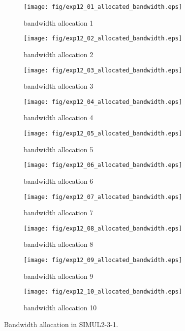 	\begin{figure}
		\begin{center}
			\begin{subfigure}[b]{0.32\textwidth}
				\texttt{[image: fig/exp12\_01\_allocated\_bandwidth.eps]}
				\caption{bandwidth allocation 1}
				\label{figure:simul2_3_1_b_a}
			\end{subfigure}
			\begin{subfigure}[b]{0.32\textwidth}
				\texttt{[image: fig/exp12\_02\_allocated\_bandwidth.eps]}
				\caption{bandwidth allocation 2}
				\label{figure:simul2_3_1_b_b}
			\end{subfigure}
			\begin{subfigure}[b]{0.32\textwidth}
				\texttt{[image: fig/exp12\_03\_allocated\_bandwidth.eps]}
				\caption{bandwidth allocation 3}
				\label{figure:simul2_3_1_b_c}
			\end{subfigure}
			\begin{subfigure}[b]{0.32\textwidth}
				\texttt{[image: fig/exp12\_04\_allocated\_bandwidth.eps]}
				\caption{bandwidth allocation 4}
				\label{figure:simul2_3_1_b_d}
			\end{subfigure}
			\begin{subfigure}[b]{0.32\textwidth}
				\texttt{[image: fig/exp12\_05\_allocated\_bandwidth.eps]}
				\caption{bandwidth allocation 5}
				\label{figure:simul2_3_1_b_e}
			\end{subfigure}
			\begin{subfigure}[b]{0.32\textwidth}
				\texttt{[image: fig/exp12\_06\_allocated\_bandwidth.eps]}
				\caption{bandwidth allocation 6}
				\label{figure:simul2_3_1_b_f}
			\end{subfigure}
			\begin{subfigure}[b]{0.32\textwidth}
				\texttt{[image: fig/exp12\_07\_allocated\_bandwidth.eps]}
				\caption{bandwidth allocation 7}
				\label{figure:simul2_3_1_b_g}
			\end{subfigure}
			\begin{subfigure}[b]{0.32\textwidth}
				\texttt{[image: fig/exp12\_08\_allocated\_bandwidth.eps]}
				\caption{bandwidth allocation 8}
				\label{figure:simul2_3_1_b_h}
			\end{subfigure}
			\begin{subfigure}[b]{0.32\textwidth}
				\texttt{[image: fig/exp12\_09\_allocated\_bandwidth.eps]}
				\caption{bandwidth allocation 9}
				\label{figure:simul2_3_1_b_i}
			\end{subfigure}
			\begin{subfigure}[b]{0.32\textwidth}
				\texttt{[image: fig/exp12\_10\_allocated\_bandwidth.eps]}
				\caption{bandwidth allocation 10}
				\label{figure:simul2_3_1_b_j}
			\end{subfigure}
			\caption{Bandwidth allocation in SIMUL2-3-1.}
			\label{figure:simul2_3_1_ba}
		\end{center}
	\end{figure}



